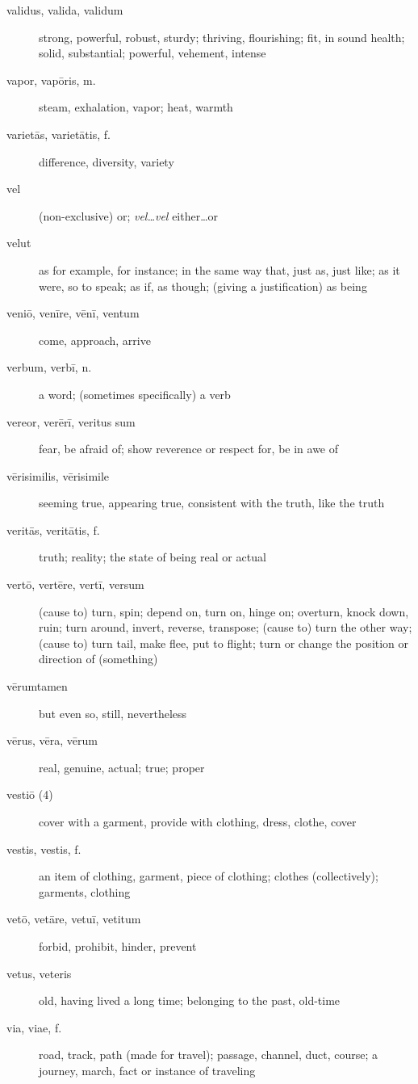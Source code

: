 \begin{description}
    \item[validus, valida, validum] \marginnote{*}strong, powerful, robust, sturdy; thriving, flourishing; fit, in sound health; solid, substantial; powerful, vehement, intense
    \item[vapor, vapōris, m.] steam, exhalation, vapor; heat, warmth
    \item[varietās, varietātis, f.] difference, diversity, variety
    \item[vel] \marginnote{*}(non-exclusive) or; \textit{vel\dots vel} either\dots or
    \item[velut] \marginnote{*}as for example, for instance; in the same way that, just as, just like; as it were, so to speak; as if, as though; (giving a justification) as being
    \item[veniō, venīre, vēnī, ventum] \marginnote{*}come, approach, arrive
    \item[verbum, verbī, n.] \marginnote{*}a word; (sometimes specifically) a verb
    \item[vereor, verērī, veritus sum] \marginnote{*}fear, be afraid of; show reverence or respect for, be in awe of
    \item[vērisimilis, vērisimile] seeming true, appearing true, consistent with the truth, like the truth
    \item[veritās, veritātis, f.] truth; reality; the state of being real or actual
    \item[vertō, vertēre, vertī, versum] \marginnote{*}(cause to) turn, spin; depend on, turn on, hinge on; overturn, knock down, ruin; turn around, invert, reverse, transpose; (cause to) turn the other way; (cause to) turn tail, make flee, put to flight; turn or change the position or direction of (something)
    \item[vērumtamen] but even so, still, nevertheless
    \item[vērus, vēra, vērum] \marginnote{*}real, genuine, actual; true; proper
    \item[vestiō (4)] cover with a garment, provide with clothing, dress, clothe, cover
    \item[vestis, vestis, f.] an item of clothing, garment, piece of clothing; clothes (collectively); garments, clothing
    \item[vetō, vetāre, vetuī, vetitum] \marginnote{*}forbid, prohibit, hinder, prevent
    \item[vetus, veteris] \marginnote{*}old, having lived a long time; belonging to the past, old-time
    \item[via, viae, f.] \marginnote{*}road, track, path (made for travel); passage, channel, duct, course; a journey, march, fact or instance of traveling

\end{description}
